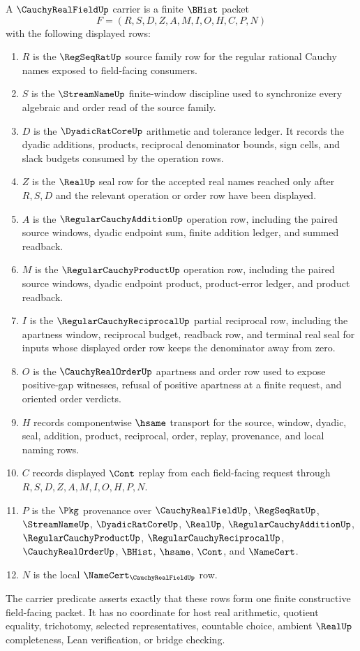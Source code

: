\begin{definition}
\label{def:cauchy-real-field-carrier}
A $\CauchyRealFieldUp$ carrier is a finite $\BHist$ packet
$$
F=(R,S,D,Z,A,M,I,O,H,C,P,N)
$$
with the following displayed rows:
\begin{enumerate}
\item $R$ is the $\RegSeqRatUp$ source family row for the regular rational Cauchy names exposed to field-facing consumers.
\item $S$ is the $\StreamNameUp$ finite-window discipline used to synchronize every algebraic and order read of the source family.
\item $D$ is the $\DyadicRatCoreUp$ arithmetic and tolerance ledger. It records the dyadic additions, products, reciprocal denominator bounds, sign cells, and slack budgets consumed by the operation rows.
\item $Z$ is the $\RealUp$ seal row for the accepted real names reached only after $R,S,D$ and the relevant operation or order row have been displayed.
\item $A$ is the $\RegularCauchyAdditionUp$ operation row, including the paired source windows, dyadic endpoint sum, finite addition ledger, and summed readback.
\item $M$ is the $\RegularCauchyProductUp$ operation row, including the paired source windows, dyadic endpoint product, product-error ledger, and product readback.
\item $I$ is the $\RegularCauchyReciprocalUp$ partial reciprocal row, including the apartness window, reciprocal budget, readback row, and terminal real seal for inputs whose displayed order row keeps the denominator away from zero.
\item $O$ is the $\CauchyRealOrderUp$ apartness and order row used to expose positive-gap witnesses, refusal of positive apartness at a finite request, and oriented order verdicts.
\item $H$ records componentwise $\hsame$ transport for the source, window, dyadic, seal, addition, product, reciprocal, order, replay, provenance, and local naming rows.
\item $C$ records displayed $\Cont$ replay from each field-facing request through $R,S,D,Z,A,M,I,O,H,P,N$.
\item $P$ is the $\Pkg$ provenance over $\CauchyRealFieldUp$, $\RegSeqRatUp$, $\StreamNameUp$, $\DyadicRatCoreUp$, $\RealUp$, $\RegularCauchyAdditionUp$, $\RegularCauchyProductUp$, $\RegularCauchyReciprocalUp$, $\CauchyRealOrderUp$, $\BHist$, $\hsame$, $\Cont$, and $\NameCert$.
\item $N$ is the local $\NameCert_{\CauchyRealFieldUp}$ row.
\end{enumerate}
The carrier predicate asserts exactly that these rows form one finite constructive field-facing packet. It has no coordinate for host real arithmetic, quotient equality, trichotomy, selected representatives, countable choice, ambient $\RealUp$ completeness, Lean verification, or bridge checking.
\end{definition}

